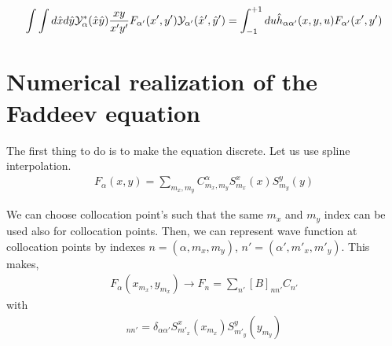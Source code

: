 \documentclass[11pt]{article}
\newcommand{\bea}{\begin{eqnarray}}
\newcommand{\eea}{\end{eqnarray}}
\begin{document}
\bea
\int \int d\hat{x} d\hat{y} {\cal Y}^*_{\alpha}(\hat{x}\hat{y})
     \frac{xy}{x'y'}F_{\alpha'}(x', y')
      {\cal Y}_{\alpha'}(\hat{x}',\hat{y}')
 =\int^{+1}_{-1} du \hat{h}_{\alpha\alpha'}(x,y,u)F_{\alpha'}(x',y')     
\eea

\section{Numerical realization of the Faddeev equation}
The first thing to do is to make the equation discrete.
Let us use spline interpolation.
\bea
F_\alpha(x,y)=\sum_{m_x,m_y} C^\alpha_{m_x,m_y} 
             S^x_{m_x}(x) S^y_{m_y}(y)
\eea  

We can choose collocation point's such that the same $m_x$
and $m_y$ index can be used also for collocation points.
Then, we can represent wave function at collocation
points by indexes $n=(\alpha,m_x,m_y)$, $n'=(\alpha',m'_x,m'_y)$.
This makes,
\bea
F_{\alpha}(x_{m_x},y_{m_x})\to F_{n}
      =\sum_{n'}[B]_{nn'} C_{n'} 
\eea 
with
\bea
[B]_{nn'}
=\delta_{\alpha\alpha'}S^x_{m'_x}(x_{m_x})S^y_{m'_y}(y_{m_y})
\eea
\end{document}
